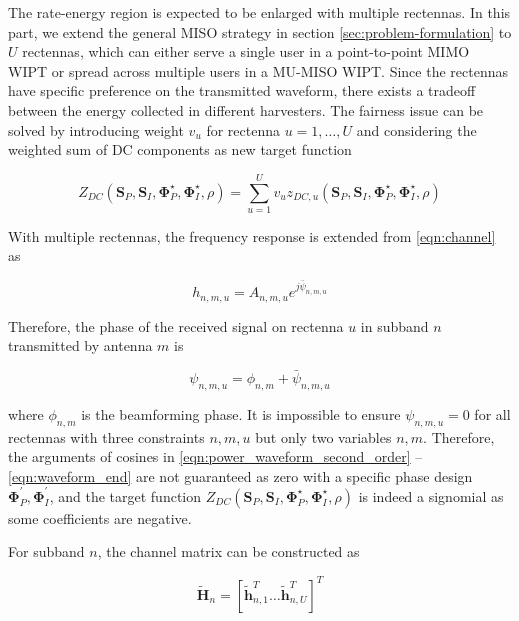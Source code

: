 The rate-energy region is expected to be enlarged with multiple rectennas. In this part, we extend the general MISO strategy in section \ref{sec:problem-formulation} to $U$ rectennas, which can either serve a single user in a point-to-point MIMO WIPT or spread across multiple users in a MU-MISO WIPT. Since the rectennas have specific preference on the transmitted waveform, there exists a tradeoff between the energy collected in different harvesters. The fairness issue can be solved by introducing weight ${v_u}$ for rectenna $u = 1, \ldots ,U$ and considering the weighted sum of DC components as new target function

\begin{equation}\label{eqn:weighted_target}
  {Z_{DC}}\left( {{{\mathbf{S}}_P},{{\mathbf{S}}_I},{\mathbf{\Phi }}_P^ \star ,{\mathbf{\Phi }}_I^ \star ,\rho } \right) = \sum\limits_{u = 1}^U {{v_u}{z_{DC,u}}\left( {{{\mathbf{S}}_P},{{\mathbf{S}}_I},{\mathbf{\Phi }}_P^ \star ,{\mathbf{\Phi }}_I^ \star ,\rho } \right)} 
\end{equation}

With multiple rectennas, the frequency response is extended from \ref{eqn:channel} as

\begin{equation}\label{eqn:mo_channel}
  {h_{n,m,u}} = {A_{n,m,u}}{e^{j{{\bar \psi }_{n,m,u}}}}
\end{equation}

Therefore, the phase of the received signal on rectenna $u$ in subband $n$ transmitted by antenna $m$ is

\begin{equation}\label{eqn:received_phase}
  {\psi _{n,m,u}} = {\phi _{n,m}} + {{\bar \psi }_{n,m,u}}
\end{equation}

where ${\phi _{n,m}}$ is the beamforming phase. It is impossible to ensure ${\psi _{n,m,u}} = 0$ for all rectennas with three constraints $n,m,u$ but only two variables $n,m$. Therefore, the arguments of cosines in \ref{eqn:power_waveform_second_order} -- \ref{eqn:waveform_end} are not guaranteed as zero with a specific phase design ${\mathbf{\Phi }}_P^\prime ,{\mathbf{\Phi }}_I^\prime $, and the target function ${Z_{DC}}\left( {{{\mathbf{S}}_P},{{\mathbf{S}}_I},{\mathbf{\Phi }}_P^ \star ,{\mathbf{\Phi }}_I^ \star ,\rho } \right)$ is indeed a signomial as some coefficients are negative. 

For subband $n$, the channel matrix can be constructed as

\begin{equation}\label{eqn:mo_channel_matrox}
  {\widetilde {\mathbf{H}}_n} = {\left[ {\widetilde {\mathbf{h}}_{n,1}^T \ldots \widetilde {\mathbf{h}}_{n,U}^T} \right]^T}
\end{equation}

